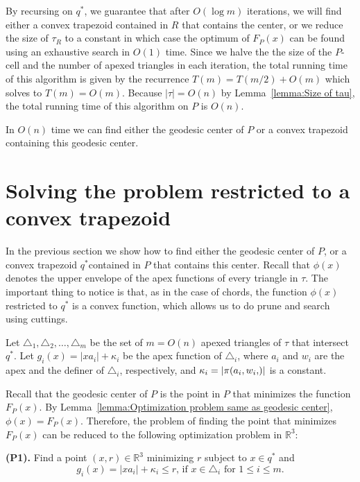 \documentclass[a4paper,UKenglish]{lipics}
\newcommand{\F}[2]{\ensuremath{F_{\scriptscriptstyle #1}(#2)}}
\newcommand{\g}[2]{\ensuremath{|\pi(#1, #2)|}}
\begin{document}
By recursing on $q^*$, we guarantee that after $O(\log m)$ iterations, we will find either a convex trapezoid contained in $R$ that contains the center, or we reduce the size of $\tau_R$ to a constant in which case the optimum of $\F{P}{x}$ can be found using an exhaustive search in $O(1)$ time. Since we halve the the size of the $P$-cell and the number of apexed triangles in each iteration, the total running time of this algorithm is given by the recurrence $T(m) = T(m/2) + O(m)$ which solves to $T(m) = O(m)$. 
Because $|\tau| = O(n)$ by Lemma~\ref{lemma:Size of tau}, the total running time of this algorithm on $P$ is $O(n)$.

\begin{lemma}\label{lemma:Finding the convex trapezoid}
In $O(n)$ time we can find either the geodesic center of $P$ or a convex trapezoid containing this geodesic center.
\end{lemma}


\section{Solving the problem restricted to a convex trapezoid}\label{Section:Solving convex optimization poblem}
In the previous section we show how to find either the geodesic center of $P$, or a convex trapezoid $q^*$contained in $P$ that contains this center. 
Recall that $\phi(x)$ denotes the upper envelope of the apex functions of every triangle in $\tau$.
The important thing to notice is that, as in the case of chords, the function $\phi(x)$ restricted to $q^*$ is a convex function, which allows us to do prune and search using cuttings.

Let $\triangle_{1}, \triangle_{2}, \ldots, \triangle_{m}$ be the set of $m= O(n)$ apexed triangles of $\tau$ that intersect $q^*$. Let $g_i(x) = |x a_i| + \kappa_i$ be the apex function of $\triangle_i$, where $a_i$ and $w_i$ are the apex and the definer of $\triangle_i$, respectively, and $\kappa_i = \g{a_i, w_i}$ is a constant.

Recall that the geodesic center of $P$ is the point in $P$ that minimizes the function $\F{P}{x}$.
By Lemma~\ref{lemma:Optimization problem same as geodesic center}, $\phi(x) = \F{P}{x}$. 
Therefore, the problem of finding the point that minimizes $\F{P}{x}$ can be reduced to the following optimization problem in $\mathbb{R}^3$:

\textbf{(P1).} Find a point $(x,r)\in \mathbb{R}^3$ minimizing $r$ subject to $x\in q^*$ and
$$\text{$g_i(x) = |x a_i| + \kappa_i \leq r$, if $x\in \triangle_{i}$ for $1\leq i \leq m$}.$$
\end{document}
